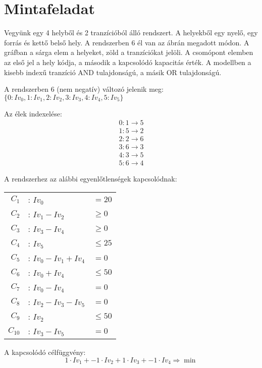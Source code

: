 \section{Mintafeladat}
Vegyünk egy 4 helyből és 2 tranzícióból álló rendszert. A helyekből egy nyelő, egy forrás és kettő belső hely. A rendszerben 6 él van az ábrán megadott módon.  A gráfban a sárga elem a helyeket, zöld a tranzíciókat jelöli. A csomópont elemben az első jel a hely kódja, a második a kapcsolódó kapacitás érték. A modellben a kisebb indexű tranzíció AND tulajdonságú, a másik OR tulajdonságú. 

A rendszerben 6 (nem negatív) változó jelenik meg:  $\{0: Iv_0, 1: Iv_1, 2: Iv_2, 3: Iv_3, 4: Iv_4, 5: Iv_5\}$

Az élek indexelése:
\begin{align*}
0  :  1 \rightarrow 5  \\
1  :  5 \rightarrow 2  \\
2  :  2 \rightarrow 6  \\
3  :  6 \rightarrow 3  \\
4  :  3 \rightarrow 5  \\
5  :  6 \rightarrow 4 
\end{align*}

A rendszerhez az alábbi egyenlőtlenségek kapcsolódnak:

\begin{center}
\begin{tabular}{rll}
$C_1$ &: $Iv_0$ &$= 20$ \\
$C_2$ &: $Iv_1 - Iv_2$ &$\geq 0$\\
$C_3$ &: $Iv_3 - Iv_4$ &$\geq 0$\\
$C_4$ &: $Iv_5$ &$\leq 25$\\
$C_5$ &: $Iv_0 - Iv_1 + Iv_4$ &$= 0$\\
$C_6$ &: $Iv_0 + Iv_4 $&$\leq 50$\\
$C_7$ &: $Iv_0 - Iv_4 $&$= 0$\\
$C_8$ &: $Iv_2 - Iv_3 - Iv_5$&$= 0$\\
$C_9$ &: $Iv_2 $&$\leq 50$\\
$C_{10}$ &: $Iv_3 - Iv_5 $&$= 0$
\end{tabular}
\end{center}

A kapcsolódó célfüggvény:
$$1\cdot Iv_1 + -1\cdot Iv_2 + 1\cdot Iv_3 + -1\cdot Iv_4\Rightarrow \min$$

